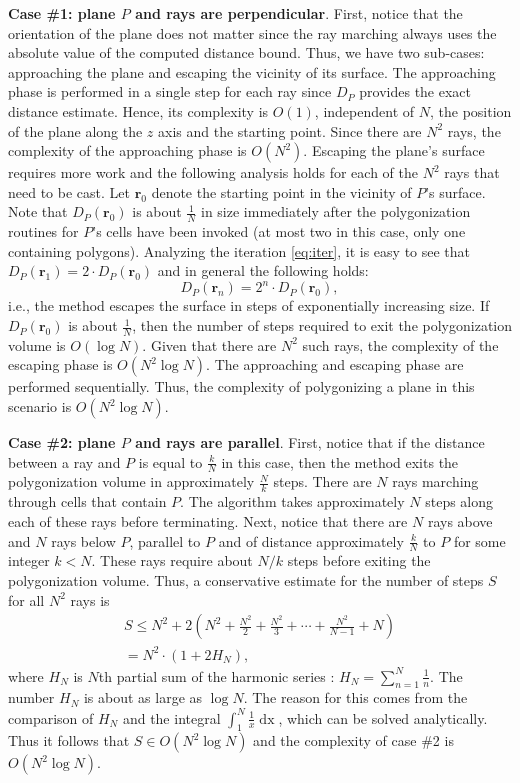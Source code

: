 \documentclass[11pt,twocolumn]{article}
\begin{document}
			\textbf{Case \#1: plane $P$ and rays are perpendicular}.
			First, notice that the orientation of the plane does not matter since the ray marching always uses the absolute value of the computed distance bound.
			Thus, we have two sub-cases: approaching the plane and escaping the vicinity of its surface.
			The approaching phase is performed in a single step for each ray since $D_P$ provides the exact distance estimate.
			Hence, its complexity is $O(1)$, independent of $N$, the position of the plane along the $z$ axis and the starting point.
			Since there are $N^2$ rays, the complexity of the approaching phase is $O(N^2)$.
			Escaping the plane's surface requires more work and the following analysis holds for each of the $N^2$ rays that need to be cast.
			Let $\mathbf{r}_0$ denote the starting point in the vicinity of $P$'s surface.
			Note that $D_P(\mathbf{r}_0)$ is about $\frac{1}{N}$ in size immediately after the polygonization routines for $P$'s cells have been invoked
			(at most two in this case, only one containing polygons).
			Analyzing the iteration \eqref{eq:iter}, it is easy to see that $D_P(\mathbf{r}_1)=2\cdot D_P(\mathbf{r}_0)$ and in general the following holds:
			\begin{equation}
				D_P(\mathbf{r}_n)=2^n\cdot D_P(\mathbf{r}_0)
				,
			\end{equation}
			i.e., the method escapes the surface in steps of exponentially increasing size.
			If $D_P(\mathbf{r}_0)$ is about $\frac{1}{N}$, then the number of steps required to exit the polygonization volume is $O(\log N)$.
			Given that there are $N^2$ such rays, the complexity of the escaping phase is $O(N^2\log N)$.
			The approaching and escaping phase are performed sequentially.
			Thus, the complexity of polygonizing a plane in this scenario is $O(N^2\log N)$.

			\textbf{Case \#2: plane $P$ and rays are parallel}.
			First, notice that if the distance between a ray and $P$ is equal to $\frac{k}{N}$ in this case, then the method exits the polygonization volume in approximately $\frac{N}{k}$ steps.
			There are $N$ rays marching through cells that contain $P$.
			The algorithm takes approximately $N$ steps along each of these rays before terminating.
			Next, notice that there are $N$ rays above and $N$ rays below $P$, parallel to $P$ and of distance approximately $\frac{k}{N}$ to $P$ for some integer $k < N$.
			These rays require about $N/k$ steps before exiting the polygonization volume.
			Thus, a conservative estimate for the number of steps $S$ for all $N^2$ rays is
			\begin{multline}
				S\leq
				N^2 + 2\left( N^2 + \frac{N^2}{2} + \frac{N^2}{3} + \cdots + \frac{N^2}{N-1}  + N \right)\\
				=N^2\cdot\left(1 + 2H_N\right)
				,
			\end{multline}
			where $H_N$ is $N$th partial sum of the harmonic series \cite{hseries}: $H_N=\sum_{n=1}^N \frac{1}{n}$.
			The number $H_N$ is about as large as $\log N$.
			The reason for this comes from the comparison of $H_N$ and the integral $\int_1^{N}\frac{1}{x}\mathop{dx}$,
			which can be solved analytically.
			Thus it follows that $S\in O(N^2\log N)$ and the complexity of case \#2 is $O(N^2\log N)$.
\end{document}
